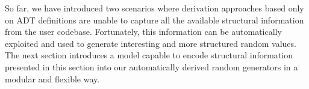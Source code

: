 






So far, we have introduced two scenarios where derivation approaches based only
on ADT definitions are unable to capture all the available structural
information from the user codebase.
%
Fortunately, this information can be automatically exploited and used to
generate interesting and more structured random values.
%
The next section introduces a model capable to encode structural information
presented in this section into our automatically derived random generators in a
modular and flexible way.







